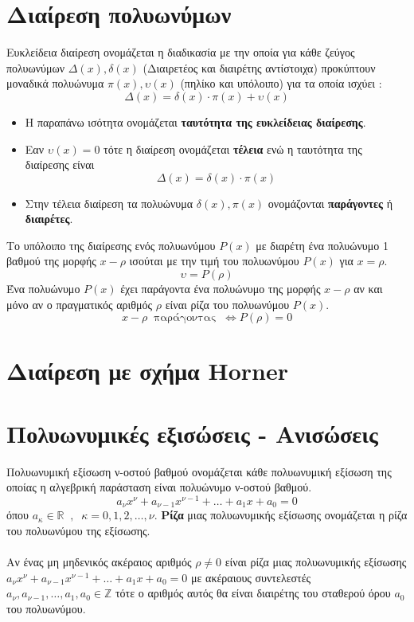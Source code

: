 \section{Διαίρεση πολυωνύμων}
\orismoi
{}
Ευκλείδεια διαίρεση ονομάζεται η διαδικασία με την οποία για κάθε ζεύγος πολυωνύμων $ \varDelta(x),\delta(x) $ (Διαιρετέος και διαιρέτης αντίστοιχα) προκύπτουν μοναδικά πολυώνυμα $ \pi(x),\upsilon(x) $ (πηλίκο και υπόλοιπο) για τα οποία ισχύει :
\[ \varDelta(x)=\delta(x)\cdot\pi(x)+\upsilon(x) \]
\begin{itemize}[itemsep=0mm]
\item Η παραπάνω ισότητα ονομάζεται \textbf{ταυτότητα της ευκλείδειας διαίρεσης}.
\item Εαν $ \upsilon(x)=0 $ τότε η διαίρεση ονομάζεται \textbf{τέλεια} ενώ η ταυτότητα της διαίρεσης είναι
\[ \varDelta(x)=\delta(x)\cdot\pi(x) \]
\item Στην τέλεια διαίρεση τα πολυώνυμα $ \delta(x),\pi(x) $ ονομάζονται \textbf{παράγοντες} ή \textbf{διαιρέτες}.
\end{itemize}
\thewrhmata
{}
Το υπόλοιπο της διαίρεσης ενός πολυωνύμου $ P(x) $ με διαρέτη ένα πολυώνυμο 1 βαθμού της μορφής $ x-\rho $ ισούται με την τιμή του πολυωνύμου $ P(x) $ για $ x=\rho $.
\[ \upsilon=P(\rho) \]
Ένα πολυώνυμο $ P(x) $ έχει παράγοντα ένα πολυώνυμο της μορφής $ x-\rho $ αν και μόνο αν ο πραγματικός αριθμός $ \rho $ είναι ρίζα του πολυωνύμου $ P(x) $.
\[ x-\rho\ \textrm{ παράγοντας }\ \Leftrightarrow P(\rho)=0 \]
\section{Διαίρεση με σχήμα Horner}
\section{Πολυωνυμικές εξισώσεις - Ανισώσεις}
\orismoi
{}
Πολυωνυμική εξίσωση ν-οστού βαθμού ονομάζεται κάθε πολυωνυμική εξίσωση της οποίας η αλγεβρική παράσταση είναι πολυώνυμο ν-οστού βαθμού.
\[ a_\nu x^\nu+a_{\nu-1}x^{\nu-1}+\ldots+a_1x+a_0=0 \]
όπου $ a_\kappa\in\mathbb{R}\;\;,\;\;\kappa=0,1,2,\ldots,\nu $. \textbf{Ρίζα} μιας πολυωνυμικής εξίσωσης ονομάζεται η ρίζα του πολυωνύμου της εξίσωσης.\\\\
\thewrhmata
{}
Αν ένας μη μηδενικός ακέραιος αριθμός $ \rho\neq0 $ είναι ρίζα μιας πολυωνυμικής εξίσωσης $ a_\nu x^\nu+a_{\nu-1}x^{\nu-1}+\ldots+a_1x+a_0=0 $ με ακέραιους συντελεστές $ a_\nu ,a_{\nu-1},\ldots,a_1,a_0\in\mathbb{Z} $ τότε ο αριθμός αυτός θα είναι διαιρέτης του σταθερού όρου $ a_0 $ του πολυωνύμου.

